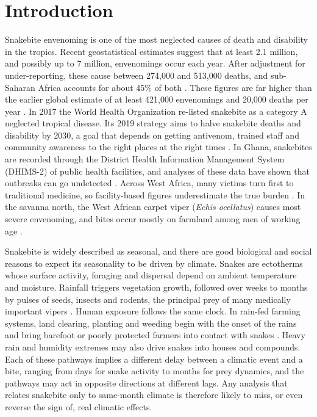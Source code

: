 \documentclass[11pt,a4paper]{article}
\begin{document}
\section{Introduction}

Snakebite envenoming is one of the most neglected causes of death and disability in the tropics. Recent geostatistical estimates suggest that at least 2.1 million, and possibly up to 7 million, envenomings occur each year. After adjustment for under-reporting, these cause between 274,000 and 513,000 deaths, and sub-Saharan Africa accounts for about 45\% of both \cite{ref1}. These figures are far higher than the earlier global estimate of at least 421,000 envenomings and 20,000 deaths per year \cite{ref2}. In 2017 the World Health Organization re-listed snakebite as a category A neglected tropical disease. Its 2019 strategy aims to halve snakebite deaths and disability by 2030, a goal that depends on getting antivenom, trained staff and community awareness to the right places at the right times \cite{ref3}. In Ghana, snakebites are recorded through the District Health Information Management System (DHIMS-2) of public health facilities, and analyses of these data have shown that outbreaks can go undetected \cite{ref4}. Across West Africa, many victims turn first to traditional medicine, so facility-based figures underestimate the true burden \cite{ref5}. In the savanna north, the West African carpet viper (\emph{Echis ocellatus}) causes most severe envenoming, and bites occur mostly on farmland among men of working age \cite{ref6}.

Snakebite is widely described as seasonal, and there are good biological and social reasons to expect its seasonality to be driven by climate. Snakes are ectotherms whose surface activity, foraging and dispersal depend on ambient temperature and moisture. Rainfall triggers vegetation growth, followed over weeks to months by pulses of seeds, insects and rodents, the principal prey of many medically important vipers \cite{ref7}. Human exposure follows the same clock. In rain-fed farming systems, land clearing, planting and weeding begin with the onset of the rains and bring barefoot or poorly protected farmers into contact with snakes \cite{ref5,ref6}. Heavy rain and humidity extremes may also drive snakes into houses and compounds. Each of these pathways implies a different delay between a climatic event and a bite, ranging from days for snake activity to months for prey dynamics, and the pathways may act in opposite directions at different lags. Any analysis that relates snakebite only to same-month climate is therefore likely to miss, or even reverse the sign of, real climatic effects.
\end{document}
